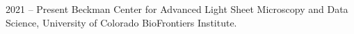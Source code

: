 2021 -- Present \hspace{14pt} Beckman Center for Advanced Light Sheet Microscopy and Data Science, University of Colorado BioFrontiers Institute. \\